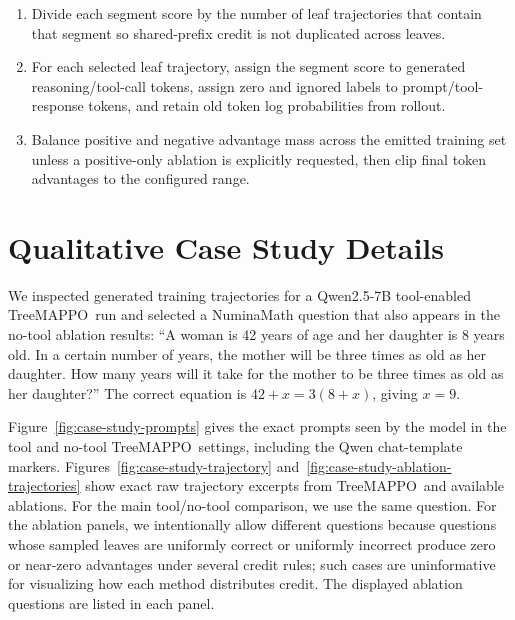 \documentclass{article}
\newcommand{\ours}{TreeMAPPO\xspace}
\begin{document}
\begin{table}[t]
{\begin{minipage}{0.94\textwidth}
\begin{enumerate}
    \item Divide each segment score by the number of leaf trajectories that contain that segment so shared-prefix credit is not duplicated across leaves.
    \item For each selected leaf trajectory, assign the segment score to generated reasoning/tool-call tokens, assign zero and ignored labels to prompt/tool-response tokens, and retain old token log probabilities from rollout.
    \item Balance positive and negative advantage mass across the emitted training set unless a positive-only ablation is explicitly requested, then clip final token advantages to the configured range.
\end{enumerate}
\end{minipage}}
\caption{MAP segment-credit optimization and conversion to token-level training data. This table describes the default \ours\ advantage path; TreeRPO, TreeRL, and GRPO ablations replace only the segment-advantage calculation step.}
\label{tab:map-optimization-pseudocode}
\end{table}

\section{Qualitative Case Study Details}
\label{app:case-study-details}
We inspected generated training trajectories for a Qwen2.5-7B tool-enabled \ours\ run and selected a NuminaMath question that also appears in the no-tool ablation results: ``A woman is 42 years of age and her daughter is 8 years old. In a certain number of years, the mother will be three times as old as her daughter. How many years will it take for the mother to be three times as old as her daughter?'' The correct equation is $42+x=3(8+x)$, giving $x=9$.

Figure~\ref{fig:case-study-prompts} gives the exact prompts seen by the model in the tool and no-tool \ours\ settings, including the Qwen chat-template markers. Figures~\ref{fig:case-study-trajectory} and~\ref{fig:case-study-ablation-trajectories} show exact raw trajectory excerpts from \ours\ and available ablations. For the main tool/no-tool comparison, we use the same question. For the ablation panels, we intentionally allow different questions because questions whose sampled leaves are uniformly correct or uniformly incorrect produce zero or near-zero advantages under several credit rules; such cases are uninformative for visualizing how each method distributes credit. The displayed ablation questions are listed in each panel.
\end{document}
